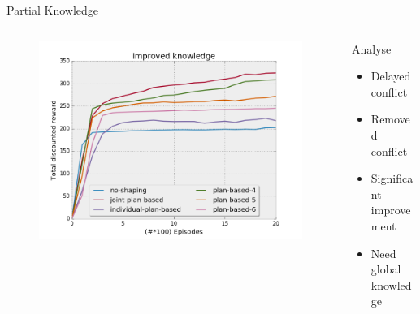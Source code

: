 \documentclass{bredelebeamer}
\begin{document}
\begin{frame}{Partial Knowledge}



\begin{columns}
\begin{column}{0.65\linewidth}

\begin{figure}[h!]
  \includegraphics[width=\linewidth]{../article/img/knowledge.png}
  \label{fig:results2}
\end{figure}

\end{column}

\begin{column}{0.45\linewidth}
\begin{block}{Analyse}
\begin{itemize}
\item Delayed conflict
\item Removed conflict
\item Significant improvement
\item Need global knowledge
\end{itemize}
\end{block}
\end{column}

\end{columns}


\end{frame}
\end{document}

